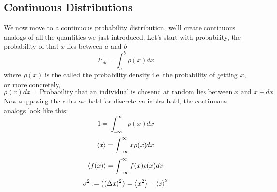 \subsection{Continuous Distributions}
We now move to a continuous probability distribution, we'll create continuous analogs of all the quantities we just introduced. Let's start with probability, the probability of that $x$ lies between $a$ and $b$
\begin{equation}
	P_{ab} = \int_{a}^{b} \rho(x) dx
\end{equation}
where $\rho(x)$ is the called the probability density i.e. the probability of getting $x$, or more concretely,
$$\rho(x)dx = \text{Probability that an individual is chosend at random lies between } x \text{ and } x + dx$$
Now supposing the rules we held for discrete variables hold, the continuous analogs look like this:
\begin{equation}
	1 = \int_{- \infty}^{\infty} \rho(x) dx
\end{equation}
\begin{equation}
	\expval{x} = \int_{- \infty}^{\infty} x \rho(x) dx
\end{equation}
\begin{equation}
	\expval{f(x)} = \int_{- \infty}^{\infty} f(x) \rho(x) dx
\end{equation}
\begin{equation}
	\sigma^{2} := \expval{(\Delta x)^{2}} = \expval{x^{2}} - {\expval{x}}^{2}
\end{equation}
